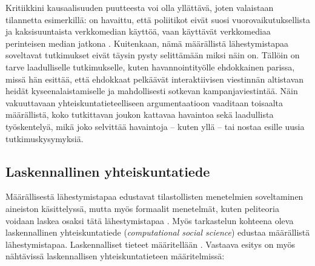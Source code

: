 \documentclass[finnish,gradu,twoside,12pt]{tktltiki}
\begin{document}
Kritiikkini kausaalisuuden puutteesta voi olla yllättävä, joten valaistaan tilannetta esimerkillä: on havaittu, että poliitikot eivät suosi vuorovaikutuksellista ja kaksisuuntaista verkkomedian käyttöä, vaan käyttävät verkkomediaa perinteisen median jatkona \citep{Golbeck2010}. Kuitenkaan, nämä määrällistä lähestymistapaa soveltavat tutkimukset eivät täysin pysty selittämään miksi näin on. Tällöin on tarve laadulliselle tutkimukselle, kuten \citet{Stromer-Galley2000} havannointityölle ehdokkainen parissa, missä hän esittää, että ehdokkaat pelkäävät interaktiivisen viestinnän altistavan heidät kyseenalaistamiselle ja mahdollisesti sotkevan kampanjaviestintää. Näin vakuuttavaan yhteiskuntatieteelliseen argumentaatioon vaaditaan toisaalta määrällistä, koko tutkittavan joukon kattavaa havaintoa sekä laadullista työskentelyä, mikä joko selvittää havaintoja -- kuten yllä -- tai nostaa esille uusia tutkimuskysymyksiä.

\subsection{Laskennallinen yhteiskuntatiede}

Määrällisestä lähestymistapaa edustavat tilastollisten menetelmien soveltaminen aineiston käsittelyssä, mutta myös formaalit menetelmät, kuten peliteoria voidaan laskea osaksi tätä lähestymistapaa \citep{a}. Myös tarkastelun kohteena oleva laskennallinen yhteiskuntatiede (\textit{computational social science}) edustaa määrällistä lähestymistapaa. Laskennalliset tieteet määritellään \citep{a,b,c}. Vastaava esitys on myös nähtävissä laskennallisen yhteiskuntatieteen määritelmissä:
\end{document}
